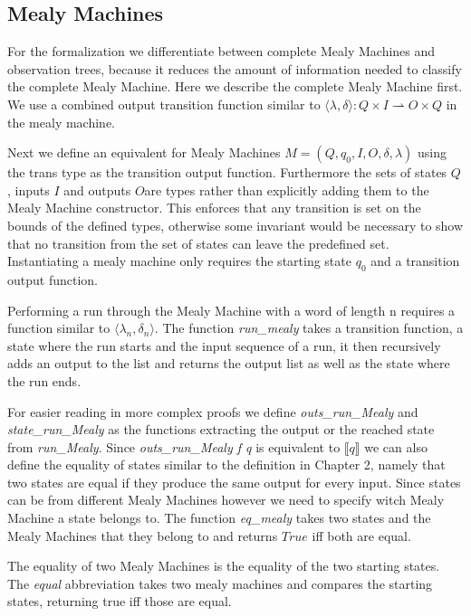 \subsection{Mealy Machines}
For the formalization we differentiate between complete Mealy Machines and observation trees, because it reduces the amount of information needed to classify the complete Mealy Machine. Here we describe the complete Mealy Machine first. We use a combined output transition function similar to $\langle\lambda,\delta\rangle:Q\times I\rightharpoonup O\times Q$ in the mealy machine. 
\begin{myisabelle}
	\transtype
\end{myisabelle}
Next we define an equivalent for Mealy Machines $M=(Q,q_0,I,O,\delta,\lambda)$ using the trans type as the transition output function. Furthermore the sets of states $Q$, inputs $I$ and outputs $O$are types rather than explicitly adding them to the Mealy Machine constructor. This enforces that any transition is set on the bounds of the defined types, otherwise some invariant would be necessary to show that no transition from the set of states can leave the predefined set. Instantiating a mealy machine only requires the starting state $q_0$ and a transition output function.
\begin{myisabelle}
	\mealytype
\end{myisabelle}
Performing a run through the Mealy Machine with a word of length n requires a function similar to $\langle\lambda_n,\delta_n\rangle$. The function \textit{run\_mealy} takes a transition function, a state where the run starts and the input sequence of a run, it then recursively adds an output to the list and returns the output list as well as the state where the run ends.
\begin{myisabelle}
	\runmealy
\end{myisabelle}
For easier reading in more complex proofs we define \textit{outs\_run\_Mealy} and \textit{state\_run\_Mealy} as the functions extracting the output or the reached state from \textit{run\_Mealy}. 
Since \textit{outs\_run\_Mealy f q} is equivalent to $\llbracket q\rrbracket$ we can also define the equality of states similar to the definition in Chapter 2, namely that two states are equal if they produce the same output for every input. Since states can be from different Mealy Machines however we need to specify witch Mealy Machine a state belongs to. The function \textit{eq\_mealy} takes two states and the Mealy Machines that they belong to and returns $True$ iff both are equal.
\begin{myisabelle}
	\eqmealydef
\end{myisabelle}
The equality of two Mealy Machines is the equality of the two starting states. The \textit{equal} abbreviation takes two mealy machines and compares the starting states, returning true iff those are equal.
\begin{myisabelle}
	\equal
\end{myisabelle}

